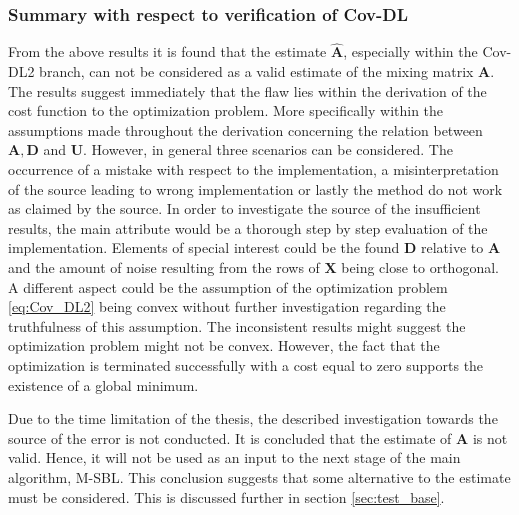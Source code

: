 \subsubsection{Summary with respect to verification of Cov-DL}
From the above results it is found that the estimate $\hat{\mathbf{A}}$, especially within the Cov-DL2 branch, can not be considered as a valid estimate of the mixing matrix $\mathbf{A}$. 
The results suggest immediately that the flaw lies within the derivation of the cost function to the optimization problem. More specifically within the assumptions made throughout the derivation concerning the relation between $\mathbf{A}, \mathbf{D}$ and $\mathbf{U}$. 
However, in general three scenarios can be considered. 
The occurrence of a mistake with respect to the implementation, a misinterpretation of the source \cite{Balkan2015} leading to wrong implementation or lastly the method do not work as claimed by the source. 
In order to investigate the source of the insufficient results, the main attribute would be a thorough step by step evaluation of the implementation. 
Elements of special interest could be the found $\mathbf{D}$ relative to $\mathbf{A}$ and the amount of noise resulting from the rows of $\mathbf{X}$ being close to orthogonal. 
A different aspect could be the assumption of the optimization problem \eqref{eq:Cov_DL2} being convex without further investigation regarding the truthfulness of this assumption. 
The inconsistent results might suggest the optimization problem might not be convex. 
However, the fact that the optimization is terminated successfully with a cost equal to zero supports the existence of a global minimum.

Due to the time limitation of the thesis, the described investigation towards the source of the error is not conducted. 
It is concluded that the estimate of $\mathbf{A}$ is not valid.
Hence, it will not be used as an input to the next stage of the main algorithm, M-SBL. 
This conclusion suggests that some alternative to the estimate must be considered. 
This is discussed further in section \ref{sec:test_base}.

